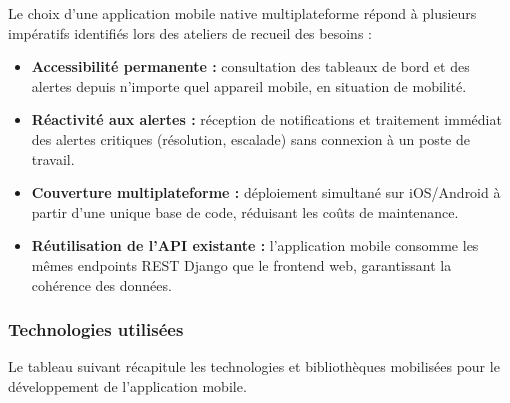 \documentclass[a4paper,12pt]{report}
\begin{document}
Le choix d'une application mobile native multiplateforme répond à plusieurs impératifs identifiés lors des ateliers de recueil des besoins :

\begin{itemize}
    \item \textbf{Accessibilité permanente :} consultation des tableaux de bord et des alertes depuis n'importe quel appareil mobile, en situation de mobilité.
    \item \textbf{Réactivité aux alertes :} réception de notifications et traitement immédiat des alertes critiques (résolution, escalade) sans connexion à un poste de travail.
    \item \textbf{Couverture multiplateforme :} déploiement simultané sur iOS/Android à partir d'une unique base de code, réduisant les coûts de maintenance.
    \item \textbf{Réutilisation de l'API existante :} l'application mobile consomme les mêmes endpoints REST Django\cite{django} que le frontend web, garantissant la cohérence des données.
\end{itemize}

\subsubsection{Technologies utilisées}

Le tableau suivant récapitule les technologies et bibliothèques mobilisées pour le développement de l'application mobile.
\end{document}
